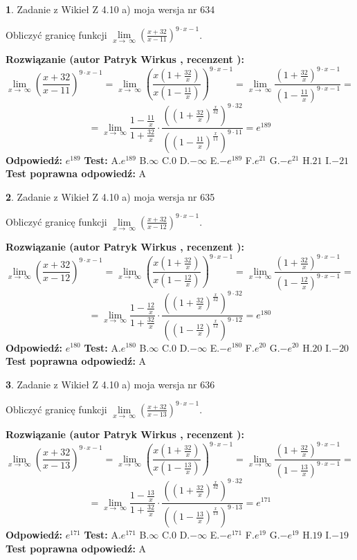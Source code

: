 \documentclass[12pt, a4paper]{article}
\theoremstyle{definition} %
\newtheorem{zad}{}
\newcommand{\zadStart}[1]{\begin{zad}#1\newline}
\newcommand{\zadStop}{\end{zad}}
\newcommand{\rozwStart}[2]{\noindent \textbf{Rozwiązanie (autor #1 , recenzent #2): }\newline}
\newcommand{\rozwStop}{\newline}
\newcommand{\odpStart}{\noindent \textbf{Odpowiedź:}\newline}
\newcommand{\odpStop}{\newline}
\newcommand{\testStart}{\noindent \textbf{Test:}\newline}
\newcommand{\testStop}{\newline}
\newcommand{\kluczStart}{\noindent \textbf{Test poprawna odpowiedź:}\newline}
\newcommand{\kluczStop}{\newline}
\begin{document}
\zadStart{Zadanie z Wikieł Z 4.10 a) moja wersja nr 634}

Obliczyć granicę funkcji  $\lim\limits_{x\to\ \infty}(\frac{x+32}{x-11})^{9\cdot x-1}$.
\zadStop
\rozwStart{Patryk Wirkus}{}
$$\lim\limits_{x\to\ \infty}(\frac{x+32}{x-11})^{9\cdot x-1} = \lim\limits_{x\to\ \infty}(\frac{x(1+\frac{32}{x})}{x(1-\frac{11}{x})})^{9\cdot x-1}=\lim\limits_{x\to\ \infty}\frac{(1+\frac{32}{x})^{9\cdot x-1}}{(1-\frac{11}{x})^{9\cdot x-1}}=$$
$$=\lim\limits_{x\to\ \infty}\frac{1-\frac{11}{x}}{1+\frac{32}{x}}\cdot\frac{((1+\frac{32}{x})^{\frac{x}{32}})^{9\cdot32}}{((1-\frac{11}{x})^{\frac{x}{11}})^{9\cdot11}}=e^{189}$$
\rozwStop
\odpStart
$e^{189}$
\odpStop
\testStart
A.$e^{189}$ B.$\infty$ C.$0$ D.$-\infty$ E.$-e^{189}$
F.$e^{21}$ G.$-e^{21}$
H.$21$
I.$-21$
\testStop
\kluczStart
A
\kluczStop



\zadStart{Zadanie z Wikieł Z 4.10 a) moja wersja nr 635}

Obliczyć granicę funkcji  $\lim\limits_{x\to\ \infty}(\frac{x+32}{x-12})^{9\cdot x-1}$.
\zadStop
\rozwStart{Patryk Wirkus}{}
$$\lim\limits_{x\to\ \infty}(\frac{x+32}{x-12})^{9\cdot x-1} = \lim\limits_{x\to\ \infty}(\frac{x(1+\frac{32}{x})}{x(1-\frac{12}{x})})^{9\cdot x-1}=\lim\limits_{x\to\ \infty}\frac{(1+\frac{32}{x})^{9\cdot x-1}}{(1-\frac{12}{x})^{9\cdot x-1}}=$$
$$=\lim\limits_{x\to\ \infty}\frac{1-\frac{12}{x}}{1+\frac{32}{x}}\cdot\frac{((1+\frac{32}{x})^{\frac{x}{32}})^{9\cdot32}}{((1-\frac{12}{x})^{\frac{x}{12}})^{9\cdot12}}=e^{180}$$
\rozwStop
\odpStart
$e^{180}$
\odpStop
\testStart
A.$e^{180}$ B.$\infty$ C.$0$ D.$-\infty$ E.$-e^{180}$
F.$e^{20}$ G.$-e^{20}$
H.$20$
I.$-20$
\testStop
\kluczStart
A
\kluczStop



\zadStart{Zadanie z Wikieł Z 4.10 a) moja wersja nr 636}

Obliczyć granicę funkcji  $\lim\limits_{x\to\ \infty}(\frac{x+32}{x-13})^{9\cdot x-1}$.
\zadStop
\rozwStart{Patryk Wirkus}{}
$$\lim\limits_{x\to\ \infty}(\frac{x+32}{x-13})^{9\cdot x-1} = \lim\limits_{x\to\ \infty}(\frac{x(1+\frac{32}{x})}{x(1-\frac{13}{x})})^{9\cdot x-1}=\lim\limits_{x\to\ \infty}\frac{(1+\frac{32}{x})^{9\cdot x-1}}{(1-\frac{13}{x})^{9\cdot x-1}}=$$
$$=\lim\limits_{x\to\ \infty}\frac{1-\frac{13}{x}}{1+\frac{32}{x}}\cdot\frac{((1+\frac{32}{x})^{\frac{x}{32}})^{9\cdot32}}{((1-\frac{13}{x})^{\frac{x}{13}})^{9\cdot13}}=e^{171}$$
\rozwStop
\odpStart
$e^{171}$
\odpStop
\testStart
A.$e^{171}$ B.$\infty$ C.$0$ D.$-\infty$ E.$-e^{171}$
F.$e^{19}$ G.$-e^{19}$
H.$19$
I.$-19$
\testStop
\kluczStart
A
\kluczStop
\end{document}
